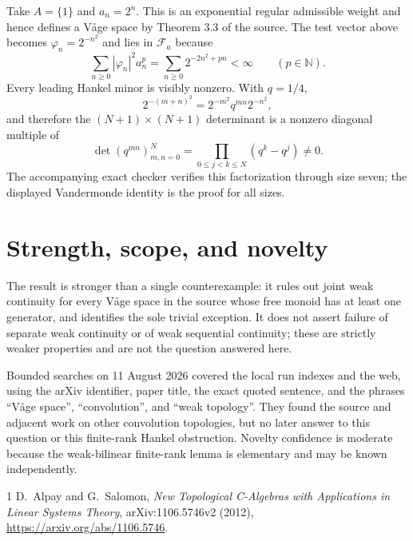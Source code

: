 \documentclass[11pt]{article}
\newcommand{\N}{\mathbb N}
\newcommand{\Fa}{\mathcal F_a}
\begin{document}
Take $A=\{1\}$ and $a_n=2^n$.  This is an exponential regular admissible
weight and hence defines a V{\aa}ge space by Theorem 3.3 of the source.  The
test vector above becomes $\varphi_n=2^{-n^2}$ and lies in $\Fa$ because
\[
 \sum_{n\ge0}|\varphi_n|^2a_n^p
 =\sum_{n\ge0}2^{-2n^2+pn}<\infty
 \qquad(p\in\N).
\]
Every leading Hankel minor is visibly nonzero.  With $q=1/4$,
\[
 2^{-(m+n)^2}=2^{-m^2}q^{mn}2^{-n^2},
\]
and therefore the $(N+1)\times(N+1)$ determinant is a nonzero diagonal
multiple of
\[
 \det(q^{mn})_{m,n=0}^N
 =\prod_{0\le j<k\le N}(q^k-q^j)\ne0.
\]
The accompanying exact checker verifies this factorization through size
seven; the displayed Vandermonde identity is the proof for all sizes.

\section{Strength, scope, and novelty}

The result is stronger than a single counterexample: it rules out joint weak
continuity for every V{\aa}ge space in the source whose free monoid has at
least one generator, and identifies the sole trivial exception.  It does not
assert failure of separate weak continuity or of weak sequential continuity;
these are strictly weaker properties and are not the question answered here.

Bounded searches on 11 August 2026 covered the local run indexes and the web,
using the arXiv identifier, paper title, the exact quoted sentence, and the
phrases ``V{\aa}ge space'', ``convolution'', and ``weak topology''.  They found
the source and adjacent work on other convolution topologies, but no later
answer to this question or this finite-rank Hankel obstruction.  Novelty
confidence is moderate because the weak-bilinear finite-rank lemma is
elementary and may be known independently.

\begin{thebibliography}{1}
D.~Alpay and G.~Salomon,
\emph{New Topological C-Algebras with Applications in Linear Systems Theory},
arXiv:1106.5746v2 (2012),
\url{https://arxiv.org/abs/1106.5746}.
\end{thebibliography}
\end{document}
